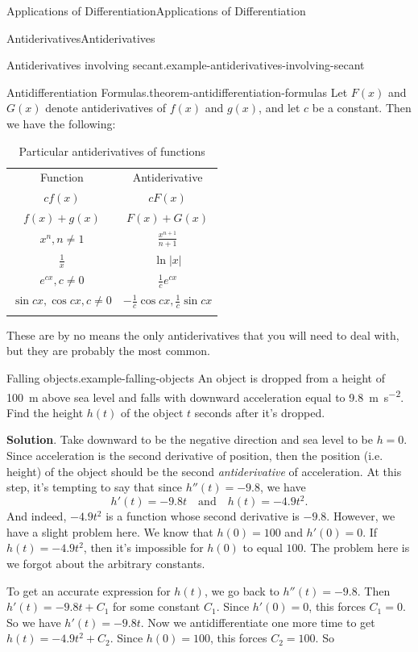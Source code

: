 \documentclass[10pt,]{book}
\numberwithin{equation}{section}
\newcommand{\hrulethin}  {\noalign{\hrule height 0.04em}}
\newcommand{\hrulethick} {\noalign{\hrule height 0.11em}}
\begin{document}
\begin{chapterptx}{Applications of Differentiation}{}{Applications of Differentiation}{}{}
\begin{sectionptx}{Antiderivatives}{}{Antiderivatives}{}{}
\begin{example}{Antiderivatives involving secant.}{example-antiderivatives-involving-secant}
\end{example}
\begin{theorem}{Antidifferentiation Formulas.}{}{theorem-antidifferentiation-formulas}%
\hypertarget{p-392}{}%
Let \(F(x)\) and \(G(x)\) denote antiderivatives of \(f(x)\) and \(g(x)\), and let \(c\) be a constant. Then we have the following: \begin{table}
\centering
\begin{tabular}{cc}\hrulethick
Function&Antiderivative\tabularnewline\hrulethin
\(cf(x)\)&\(cF(x)\)\tabularnewline[0pt]
\(f(x) + g(x)\)&\(F(x) + G(x)\)\tabularnewline[0pt]
\(x^{n}, n\neq1\)&\(\frac{x^{n+1}}{n+1}\)\tabularnewline[0pt]
\(\frac{1}{x}\)&\(\ln|x|\)\tabularnewline[0pt]
\(e^{cx}, c\neq0\)&\(\frac{1}{c}e^{cx}\)\tabularnewline[0pt]
\(\sin cx, \cos cx, c\neq 0\)&\(-\frac{1}{c}\cos cx, \frac{1}{c}\sin cx\)\tabularnewline\hrulethick
\end{tabular}
\caption{Particular antiderivatives of functions\label{table-antiderivatives}}
\end{table}
 These are by no means the only antiderivatives that you will need to deal with, but they are probably the most common.%
\end{theorem}
\begin{example}{Falling objects.}{example-falling-objects}%
\hypertarget{p-393}{}%
An object is dropped from a height of \SI{100}{\meter} above sea level and falls with downward acceleration equal to \SI{9.8}{\meter\per\second\tothe{2}}. Find the height \(h(t)\) of the object \(t\) seconds after it's dropped.%
\par\smallskip%
\noindent\textbf{Solution}.\hypertarget{solution-88}{}\quad%
\hypertarget{p-394}{}%
Take downward to be the negative direction and sea level to be \(h=0\). Since acceleration is the second derivative of position, then the position (i.e. height) of the object should be the second \emph{antiderivative} of acceleration. At this step, it's tempting to say that since \(h''(t) = -9.8\), we have%
\begin{equation*}
h'(t) = -9.8t\quad\text{and}\quad h(t) = -4.9 t^{2}\text{.}
\end{equation*}
And indeed, \(-4.9t^{2}\) is a function whose second derivative is \(-9.8\). However, we have a slight problem here. We know that \(h(0) = 100\) and \(h'(0) = 0\). If \(h(t) = -4.9t^{2}\), then it's impossible for \(h(0)\) to equal \(100\). The problem here is we forgot about the arbitrary constants.%
\par
\hypertarget{p-395}{}%
To get an accurate expression for \(h(t)\), we go back to \(h''(t) = -9.8\). Then \(h'(t) = -9.8t+C_{1}\) for some constant \(C_{1}\). Since \(h'(0) = 0\), this forces \(C_{1} = 0\). So we have \(h'(t) = -9.8t\). Now we antidifferentiate one more time to get \(h(t) = -4.9t^{2} + C_{2}\). Since \(h(0) = 100\), this forces \(C_{2} = 100\). So%

\end{example}
\end{sectionptx}
\end{chapterptx}
\end{document}
